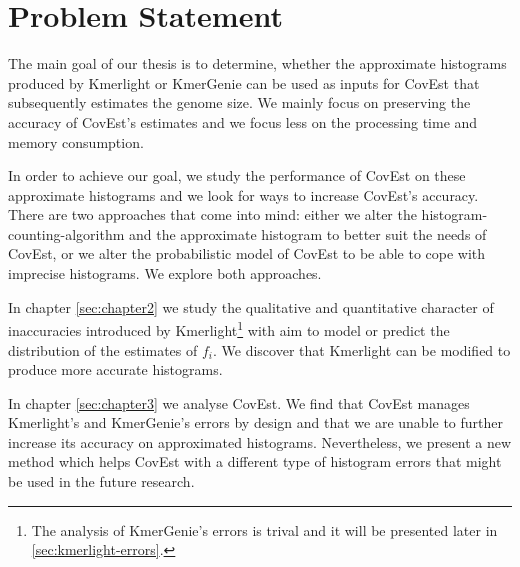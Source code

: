 \section{Problem Statement}
The main goal of our thesis is to determine, whether the approximate histograms
produced by Kmerlight or KmerGenie can be used as inputs for CovEst that 
subsequently estimates the genome size. We mainly focus on preserving the 
accuracy of CovEst's estimates and we focus less on the processing time and memory consumption. 

In order to achieve our goal, we study the performance of CovEst on these approximate
histograms and we look for ways to increase CovEst's accuracy. There are two approaches
that come into mind: either we alter the histogram-counting-algorithm and the approximate
histogram to better suit the needs of CovEst, or we alter the probabilistic model of CovEst to
be able to cope with imprecise histograms. We explore both approaches. 

In chapter \ref{sec:chapter2} we study the qualitative and quantitative character
of inaccuracies introduced by Kmerlight\footnote{The analysis of KmerGenie's errors is trival
and it will be presented later in \ref{sec:kmerlight-errors}.} with aim to model or
predict the distribution of the estimates of $f_i$. We discover that Kmerlight can be modified
to produce more accurate histograms.

In chapter \ref{sec:chapter3} we analyse CovEst. We find that CovEst manages Kmerlight's and
KmerGenie's errors by design and that we are unable to further increase its accuracy on
approximated histograms. Nevertheless, we present a new method which helps CovEst with
a different type of histogram errors that might be used in the future research.
